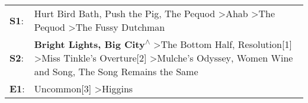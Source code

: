 \begin{supertabular}{p{0.03\textwidth}p{0.92\textwidth}}
 \textbf{S1}:  &                                                                                                                    Hurt Bird Bath\textsuperscript{}, \enspace Push the Pig\textsuperscript{}, \enspace The Pequod\textsuperscript{} \textgreater \enspace Ahab\textsuperscript{} \textgreater \enspace The Pequod\textsuperscript{} \textgreater \enspace The Fussy Dutchman\textsuperscript{}  \enspace  \\
 \textbf{S2}:  &  \textbf{Bright Lights, Big City\textsuperscript{$\wedge$}} \textgreater \enspace The Bottom Half\textsuperscript{}, \enspace Resolution[1]\textsuperscript{} \textgreater \enspace Miss Tinkle's Overture[2]\textsuperscript{} \textgreater \enspace Mulche's Odyssey\textsuperscript{}, \enspace Women Wine and Song\textsuperscript{}, \enspace The Song Remains the Same\textsuperscript{}  \enspace  \\
 \textbf{E1}:  &                                                                                                                                                                                                                                                                                                                  Uncommon[3]\textsuperscript{} \textgreater \enspace Higgins\textsuperscript{}  \enspace  \\
\end{supertabular}
